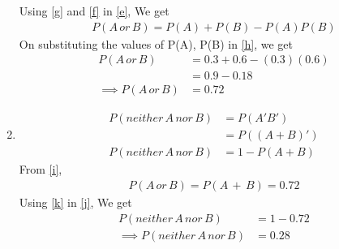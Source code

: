 \documentclass[journal,12pt,twocolumn]{IEEEtran}
\begin{document}
\begin{enumerate}[label={\roman*)}]
Using \eqref{g} and \eqref{f} in \eqref{e}, We get
\begin{align}
    P(A\,or\,B) = P(A) + P(B) - P(A)P(B)\label{h}
\end{align}
On substituting the values of P(A), P(B) in \eqref{h}, we get
\begin{align}
    P(A\,or\,B) &= 0.3 + 0.6 -(0.3)(0.6)\\
    &= 0.9-0.18\\
    \implies P(A\,or\,B) &= 0.72\label{i}
\end{align}
\item
\begin{align}
    P(neither\, A\, nor\, B) &= P(A'B')\\
    &=P((A+B)')\\
    P(neither\, A\, nor\, B)&=1-P(A+B)\label{j}
\end{align}
From \eqref{i},
\begin{align}
    P(A\,or\,B) =P(A\,+\,B)=0.72\label{k}
\end{align}
Using \eqref{k} in \eqref{j}, We get
\begin{align}
    P(neither\, A\, nor\, B)&=1-0.72\\
   \implies P(neither\, A\, nor\, B)&=0.28
\end{align}
\end{enumerate}
\end{document}
